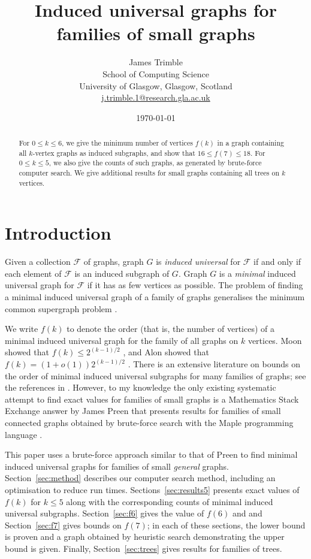 \documentclass[12pt]{article}
\title{Induced universal graphs for families of small graphs}
\author{
        James Trimble \\
                School of Computing Science\\
        University of Glasgow, Glasgow, Scotland \\
        \href{mailto:j.trimble.1@research.gla.ac.uk}{j.trimble.1@research.gla.ac.uk}
}
\date{\today}
\newcommand{\calF}{\ensuremath{\mathcal{F}}}
\begin{document}
\maketitle
%
\begin{abstract}
For $0 \leq k \leq 6$, we give the minimum number of vertices $f(k)$ in a graph containing all
$k$-vertex graphs as induced subgraphs, and show
that $16 \leq f(7) \leq 18$.  For $0 \leq k \leq 5$, we also give the counts of
such graphs, as generated by brute-force computer search.  We give additional
results for small graphs containing all trees on $k$ vertices.
\end{abstract}

\section{Introduction}

Given a collection $\calF$ of graphs, graph $G$ is \emph{induced universal} for
$\calF$ if and only if each element of $\calF$ is an induced subgraph of $G$.
Graph $G$ is a \emph{minimal} induced universal graph for $\calF$ if it has as
few vertices as possible.  The problem of finding a minimal induced universal graph
of a family of graphs generalises the minimum common supergraph problem
\cite{DBLP:journals/computing/BunkeJK00}.

We write $f(k)$ to denote the order (that is, the
number of vertices) of a minimal induced universal graph for the family of all
graphs on $k$ vertices.  Moon showed that $f(k) \leq 2^{(k-1)/2}$
\cite{moon_1965}, and Alon showed that $f(k) = (1 + o(1))2^{(k-1)/2}$
\cite{alon2017asymptotically}.  There is an extensive literature on bounds on
the order of minimal induced universal subgraphs for many families of graphs;
see the references in \cite{alon2017asymptotically}.
However, to my knowledge the only
existing systematic attempt to find exact values for families of small
graphs is a Mathematics Stack Exchange answer by James Preen that presents results for families of small connected graphs obtained by brute-force search with the Maple programming language \cite{preen_math_se}.

This paper uses a brute-force approach similar to that of Preen to find minimal
induced universal graphs for families of small \emph{general} graphs.
Section~\ref{sec:method} describes our computer search method, including an
optimisation to reduce run times.  Sections~\ref{sec:results5} presents exact
values of $f(k)$ for $k \leq 5$ along with
the corresponding counts of minimal induced universal subgraphs.
Section~\ref{sec:f6} gives the value of $f(6)$ and and
Section~\ref{sec:f7} gives bounds on $f(7)$; in each of these sections, the lower
bound is proven and a graph obtained by heuristic search demonstrating the
upper bound is given.  Finally, Section~\ref{sec:trees} gives results for
families of trees.
\end{document}

